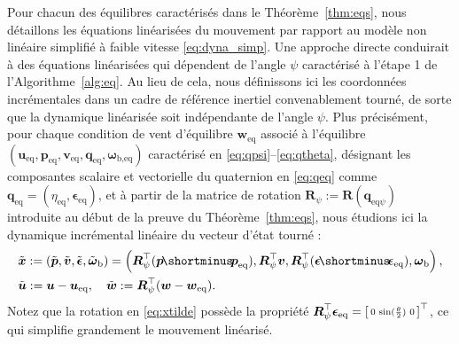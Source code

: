 Pour chacun des équilibres caractérisés dans le Théorème~\ref{thm:eqs}, nous détaillons les équations linéarisées du mouvement par rapport au modèle non linéaire simplifié à faible vitesse \eqref{eq:dyna_simp}. Une approche directe conduirait à des équations linéarisées qui dépendent de l'angle $\psi$ caractérisé à l'étape 1 de l'Algorithme~\ref{alg:eq}. Au lieu de cela, nous définissons ici les coordonnées incrémentales dans un cadre de référence inertiel convenablement tourné, de sorte que la dynamique linéarisée soit indépendante de l'angle $\psi$.
Plus précisément, pour chaque condition de vent d'équilibre $\boldsymbol{w}_{\text{eq}}$ associé à l'équilibre $(\boldsymbol{u}_{\text{eq}}, \boldsymbol{p}_{\text{eq}},\boldsymbol{v}_{\text{eq}}, \boldsymbol{q}_{\text{eq}},\boldsymbol{\omega}_{\text{b},\text{eq}})$  caractérisé en \eqref{eq:qpsi}--\eqref{eq:qtheta}, 
désignant les composantes scalaire et vectorielle du quaternion en \eqref{eq:qeq} comme
$\boldsymbol{q}_{\text{eq}} = (\eta_{\text{eq}}, \boldsymbol{\epsilon}_{\text{eq}})$, et à partir de la matrice de rotation
$\boldsymbol{R}_{\psi} :=    \boldsymbol{R}(\boldsymbol{q}_{\mathrm{eq}\psi})$ introduite au début de la preuve du Théorème~\ref{thm:eqs}, nous étudions ici la dynamique incrémental linéaire du vecteur d'état tourné :  
\begin{align}
\label{eq:xtilde}
     \nonumber &\tilde{\boldsymbol{x}} := (\tilde{\boldsymbol{p}},
     \tilde{\boldsymbol{v}},
     \tilde{\boldsymbol{\epsilon}},
     \tilde{\boldsymbol{\omega}}_{\text{b}}) = \left(\boldsymbol{R}^\top_{\psi} (\boldsymbol{p} \! \shortminus \! \boldsymbol{p}_{\text{eq}}), \boldsymbol{R}^\top_{\psi} \boldsymbol{v}, \boldsymbol{R}^\top_{\psi} (\boldsymbol{\epsilon} \! \shortminus \! \boldsymbol{\epsilon}_{\text{eq}}), \boldsymbol{\omega}_{\text{b}} \right), \\ &\tilde{\boldsymbol{u}} := \boldsymbol{u}-\boldsymbol{u_{\text{eq}}}, \quad \tilde{\boldsymbol{w}} := \boldsymbol{R}^\top_{\psi} (\boldsymbol{w}-\boldsymbol{w}_{\mathrm{eq}}).
\end{align}
Notez que la rotation en \eqref{eq:xtilde} possède la propriété $\boldsymbol{R}^\top_{\psi} \boldsymbol{\epsilon}_{\text{eq}} = \left[ \begin{smallmatrix}0 & \sin(\frac{\theta}{2}) & 0 \end{smallmatrix} \right]^\top$, ce qui simplifie grandement le mouvement linéarisé.

